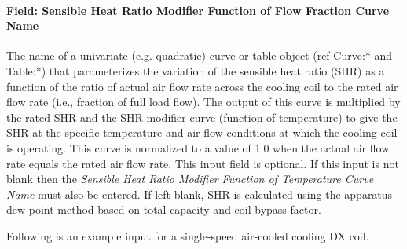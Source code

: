\paragraph{Field: Sensible Heat Ratio Modifier Function of Flow Fraction Curve Name}

The name of a univariate (e.g. quadratic) curve or table object (ref Curve:* and Table:*) that parameterizes the variation of the sensible heat ratio (SHR) as a function of the ratio of actual air flow rate across the cooling coil to the rated air flow rate (i.e., fraction of full load flow). The output of this curve is multiplied by the rated SHR and the SHR modifier curve (function of temperature) to give the SHR at the specific temperature and air flow conditions at which the cooling coil is operating. This curve is normalized to a value of 1.0 when the actual air flow rate equals the rated air flow rate. This input field is optional. If this input is not blank then the \textit{Sensible Heat Ratio Modifier Function of Temperature Curve Name} must also be entered. If left blank, SHR is calculated using the apparatus dew point method based on total capacity and coil bypass factor.

Following is an example input for a single-speed air-cooled cooling DX coil.


